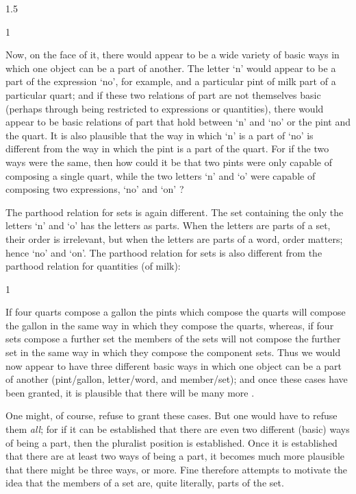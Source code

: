 \documentclass[11pt]{article}
\newenvironment{squote}{%
\begin{spacing}{1}
\begin{list}{}{%
\setlength{\labelwidth}{0pt}%
\rightmargin\leftmargin%
}
\item\relax
}{%
\end{list}%
\end{spacing}
}
\begin{document}
\begin{spacing}{1.5}
\begin{squote}
Now, on the face of it, there would appear to be a wide variety of
basic ways in which one object can be a part of another.  The letter
`n' would appear to be a part of the expression `no', for example, and
a particular pint of milk part of a particular quart; and if these two
relations of part are not themselves basic (perhaps through being
restricted to expressions or quantities), there would appear to be
basic relations of part that hold between `n' and `no' or the pint and
the quart.  It is also plausible that the way in which `n' is a part
of `no' is different from the way in which the pint is a part of the
quart.  For if the two ways were the same, then how could it be that
two pints were only capable of composing a single quart, while the two
letters `n' and `o' were capable of composing two expressions, `no'
and `on' \citeyearpar[562]{fine2010}?
\end{squote}

The parthood relation for sets is again different.  The set containing
the only the letters `n' and `o' has the letters as parts.  When the
letters are parts of a set, their order is irrelevant, but when the
letters are parts of a word, order matters; hence `no' and `on'.  The
parthood relation for sets is also different from the parthood
relation for quantities (of milk):

\begin{squote}
If four quarts compose a gallon the pints which compose the quarts
will compose the gallon in the same way in which they compose the
quarts, whereas, if four sets compose a further set the members of the
sets will not compose the further set in the same way in which they
compose the component sets.  Thus we would now appear to have three
different basic ways in which one object can be a part of another
(pint/gallon, letter/word, and member/set); and once these cases have
been granted, it is plausible that there will be many more
\citeyearpar[562]{fine2010}.
\end{squote}

One might, of course, refuse to grant these cases.  But one would have
to refuse them {\em all}; for if it can be established that there are
even two different (basic) ways of being a part, then the pluralist
position is established.  Once it is established that there are at
least two ways of being a part, it becomes much more plausible that
there might be three ways, or more.  Fine therefore attempts to
motivate the idea that the members of a set are, quite literally,
parts of the set.


\end{spacing}
\end{document}
